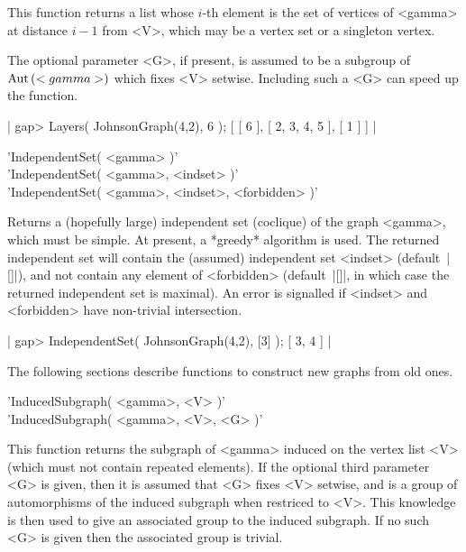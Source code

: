 This function returns a list whose $i$-th element is  the set of vertices
of  <gamma> at distance  $i-1$  from <V>, which may be a vertex  set or a
singleton vertex.

The optional  parameter  <G>, if present, is assumed to  be a subgroup of
${\rm Aut}\,(<gamma>)$ which fixes <V>  setwise.  Including such a <G> can speed
up the function.

|    gap> Layers( JohnsonGraph(4,2), 6 );
    [ [ 6 ], [ 2, 3, 4, 5 ], [ 1 ] ] |


'IndependentSet( <gamma> )' \\
'IndependentSet( <gamma>, <indset> )' \\
'IndependentSet( <gamma>, <indset>, <forbidden> )'

Returns a  (hopefully  large)  independent set  (coclique) of  the  graph
<gamma>, which must be simple.  At present, a *greedy* algorithm is used.
The returned independent set will  contain  the (assumed) independent set
<indset>  (default\:\ |[]|),  and  not contain any element of <forbidden>
(default\:\ |[]|, in which case the returned independent set is maximal).
An  error is  signalled  if  <indset>  and  <forbidden>  have non-trivial
intersection.

|    gap> IndependentSet( JohnsonGraph(4,2), [3] );
    [ 3, 4 ] |


The  following sections describe  functions to construct new  graphs from
old ones.


'InducedSubgraph( <gamma>, <V> )' \\
'InducedSubgraph( <gamma>, <V>, <G> )'

This function returns the subgraph of <gamma> induced on the  vertex list
<V> (which must not contain  repeated  elements).  If the  optional third
parameter  <G> is  given,  then it is assumed that <G> fixes <V> setwise,
and is a group of automorphisms of the induced subgraph when restriced to
<V>.   This  knowledge is then used  to give an  associated group  to the
induced subgraph. If  no such  <G> is given then the  associated group is
trivial.

